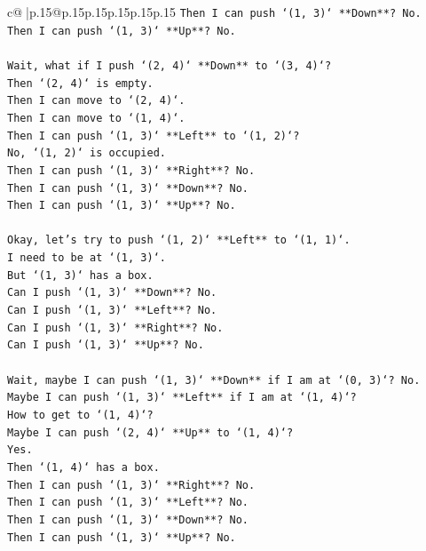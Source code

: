 \documentclass{article}
\begin{document}
{\begin{supertabular}{c@{$\;$}|p{.15\linewidth}@{}p{.15\linewidth}p{.15\linewidth}p{.15\linewidth}p{.15\linewidth}p{.15\linewidth}}
{{{\texttt{Then I can push `(1, 3)` **Down**? No.} \\
\texttt{Then I can push `(1, 3)` **Up**? No.} \\
\\ 
\texttt{Wait, what if I push `(2, 4)` **Down** to `(3, 4)`?} \\
\texttt{Then `(2, 4)` is empty.} \\
\texttt{Then I can move to `(2, 4)`.} \\
\texttt{Then I can move to `(1, 4)`.} \\
\texttt{Then I can push `(1, 3)` **Left** to `(1, 2)`?} \\
\texttt{No, `(1, 2)` is occupied.} \\
\texttt{Then I can push `(1, 3)` **Right**? No.} \\
\texttt{Then I can push `(1, 3)` **Down**? No.} \\
\texttt{Then I can push `(1, 3)` **Up**? No.} \\
\\ 
\texttt{Okay, let's try to push `(1, 2)` **Left** to `(1, 1)`.} \\
\texttt{I need to be at `(1, 3)`.} \\
\texttt{But `(1, 3)` has a box.} \\
\texttt{Can I push `(1, 3)` **Down**? No.} \\
\texttt{Can I push `(1, 3)` **Left**? No.} \\
\texttt{Can I push `(1, 3)` **Right**? No.} \\
\texttt{Can I push `(1, 3)` **Up**? No.} \\
\\ 
\texttt{Wait, maybe I can push `(1, 3)` **Down** if I am at `(0, 3)`? No.} \\
\texttt{Maybe I can push `(1, 3)` **Left** if I am at `(1, 4)`?} \\
\texttt{How to get to `(1, 4)`?} \\
\texttt{Maybe I can push `(2, 4)` **Up** to `(1, 4)`?} \\
\texttt{Yes.} \\
\texttt{Then `(1, 4)` has a box.} \\
\texttt{Then I can push `(1, 3)` **Right**? No.} \\
\texttt{Then I can push `(1, 3)` **Left**? No.} \\
\texttt{Then I can push `(1, 3)` **Down**? No.} \\
\texttt{Then I can push `(1, 3)` **Up**? No.} \\
}}}
\end{supertabular}}
\end{document}
